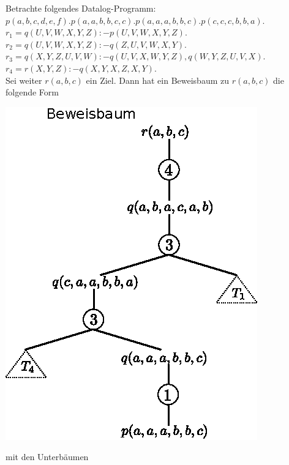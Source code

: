 \documentclass[12pt,a4paper]{amsart}
\begin{document}
\begin{aufgabe1}
Betrachte folgendes Datalog-Programm:\\
$p(a,b,c,d,e,f). p(a,a,b,b,c,c). p(a,a,a,b,b,c). p(c,c,c,b,b,a).$\\
$r_1= q(U,V,W,X,Y,Z) :- p(U,V,W,X,Y,Z).$\\
$r_2=q(U,V,W,X,Y,Z) :- q(Z,U,V,W,X,Y).$\\
$r_3=q(X,Y,Z,U,V,W) :- q(U,V,X,W,Y,Z), q(W,Y,Z,U,V,X).$\\
$r_4=r(X,Y,Z) :- q(X,Y,X,Z,X,Y).$\\
Sei weiter $r(a,b,c)$ ein Ziel. Dann hat ein Beweisbaum zu $r(a,b,c)$ die folgende Form
\begin{center}
\includegraphics[]{tree.eps}
\end{center}
mit den Unterbäumen
\begin{center}

\end{center}
\end{aufgabe1}
\end{document}
